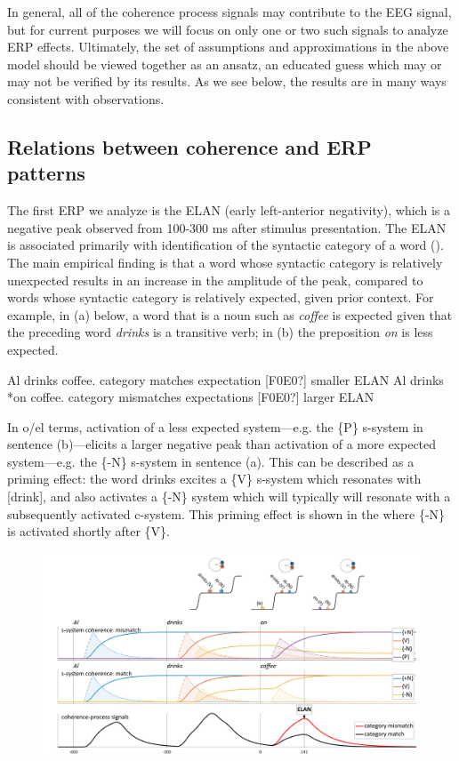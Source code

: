 In general, all of the coherence process signals may contribute to the EEG signal, but for current purposes we will focus on only one or two such signals to analyze ERP effects. Ultimately, the set of assumptions and approximations in the above model should be viewed together as an ansatz, an educated guess which may or may not be verified by its results. As we see below, the results are in many ways consistent with observations.

\subsection{Relations between coherence and ERP patterns}

The first ERP we analyze is the ELAN (early left-anterior negativity), which is a negative peak observed from 100-300 ms after stimulus presentation. The ELAN is associated primarily with identification of the syntactic category of a word (\citealt{Friederici2002,HahneFriederici1999,SteinhauerDrury2012}). The main empirical finding is that a word whose syntactic category is relatively unexpected results in an increase in the amplitude of the peak, compared to words whose syntactic category is relatively expected, given prior context. For example, in (a) below, a word that is a noun such as \textit{coffee} is expected given that the preceding word \textit{drinks} is a transitive verb; in (b) the preposition \textit{on} is less expected.

\ea
\ea Al drinks coffee.         category matches expectation [F0E0?] smaller ELAN
\ex Al drinks *on coffee.    category mismatches expectations [F0E0?] larger ELAN
\z
\z

In o/el terms, activation of a less expected system—e.g. the \{P\} s-system in sentence (b)—elicits a larger negative peak than activation of a more expected system—e.g. the \{-N\} s-system in sentence (a). This can be described as a priming effect: the word drinks excites a \{V\} s-system which resonates with [drink], and also activates a \{-N\} system which will typically will resonate with a subsequently activated c-system. This priming effect is shown in the {\figurebelow} where \{-N\} is activated shortly after \{V\}. 

  
\begin{figure}
\includegraphics[width=\textwidth]{figures/Tilsen-img142.png}
\caption{\missingcaption}
\label{fig:}
\end{figure}
 

